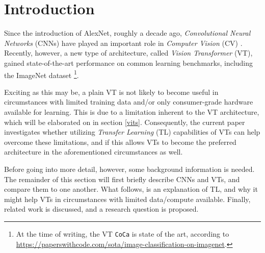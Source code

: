 \section{Introduction}
Since the introduction of AlexNet, roughly a decade ago, \textit{Convolutional Neural Networks} (CNNs) have played an important role in \textit{Computer Vision} (CV) \citep{krizhevsky2012imagened}. Recently, however, a new type of architecture, called \textit{Vision Transformer} (VT), gained state-of-the-art performance on common learning benchmarks, including the ImageNet dataset \citep{deng2009imagenet}\footnote{At the time of writing, the VT \texttt{CoCa} is state of the art, according to \url{https://paperswithcode.com/sota/image-classification-on-imagenet}.}.

Exciting as this may be, a plain VT is not likely to become useful in circumstances with limited training data and/or only consumer-grade hardware available for learning. This is due to a limitation inherent to the VT architecture, which will be elaborated on in section \ref{vits}. Consequently, the current paper investigates whether utilizing \textit{Transfer Learning} (TL) capabilities of VTs can help overcome these limitations, and if this allows VTs to become the preferred architecture in the aforementioned circumstances as well.

Before going into more detail, however, some background information is needed. The remainder of this section will first briefly describe CNNs and VTs, and compare them to one another. What follows, is an explanation of TL, and why it might help VTs in circumstances with limited data/compute available. Finally, related work is discussed, and a research question is proposed.


